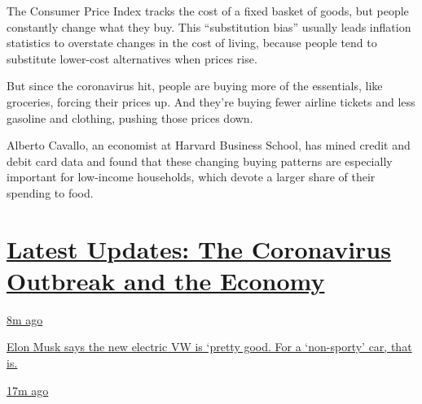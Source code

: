 The Consumer Price Index tracks the cost of a fixed basket of goods, but
people constantly change what they buy. This ``substitution bias''
usually leads inflation statistics to overstate changes in the cost of
living, because people tend to substitute lower-cost alternatives when
prices rise.

But since the coronavirus hit, people are buying more of the essentials,
like groceries, forcing their prices up. And they're buying fewer
airline tickets and less gasoline and clothing, pushing those prices
down.

Alberto Cavallo, an economist at Harvard Business School, has mined
credit and debit card data and found that these changing buying patterns
are especially important for low-income households, which devote a
larger share of their spending to food.

\hypertarget{latest-updates-the-coronavirus-outbreak-and-the-economy}{%
\section{\texorpdfstring{\href{https://www.nytimes3xbfgragh.onion/live/2020/09/08/business/stock-market-today-coronavirus?action=click\&pgtype=Article\&state=default\&region=MAIN_CONTENT_1\&context=storylines_live_updates}{Latest
Updates: The Coronavirus Outbreak and the
Economy}}{Latest Updates: The Coronavirus Outbreak and the Economy}}\label{latest-updates-the-coronavirus-outbreak-and-the-economy}}

\href{https://www.nytimes3xbfgragh.onion/live/2020/09/08/business/stock-market-today-coronavirus?action=click\&pgtype=Article\&state=default\&region=MAIN_CONTENT_1\&context=storylines_live_updates\#elon-musk-says-the-new-electric-vw-is-pretty-good-for-a-non-sporty-car-that-is}{8m
ago}

\href{https://www.nytimes3xbfgragh.onion/live/2020/09/08/business/stock-market-today-coronavirus?action=click\&pgtype=Article\&state=default\&region=MAIN_CONTENT_1\&context=storylines_live_updates\#elon-musk-says-the-new-electric-vw-is-pretty-good-for-a-non-sporty-car-that-is}{Elon
Musk says the new electric VW is `pretty good. For a `non-sporty' car,
that is.}

\href{https://www.nytimes3xbfgragh.onion/live/2020/09/08/business/stock-market-today-coronavirus?action=click\&pgtype=Article\&state=default\&region=MAIN_CONTENT_1\&context=storylines_live_updates\#wage-violations-have-spiked-as-low-paid-workers-become-more-vulnerable-study-says}{17m
ago}


